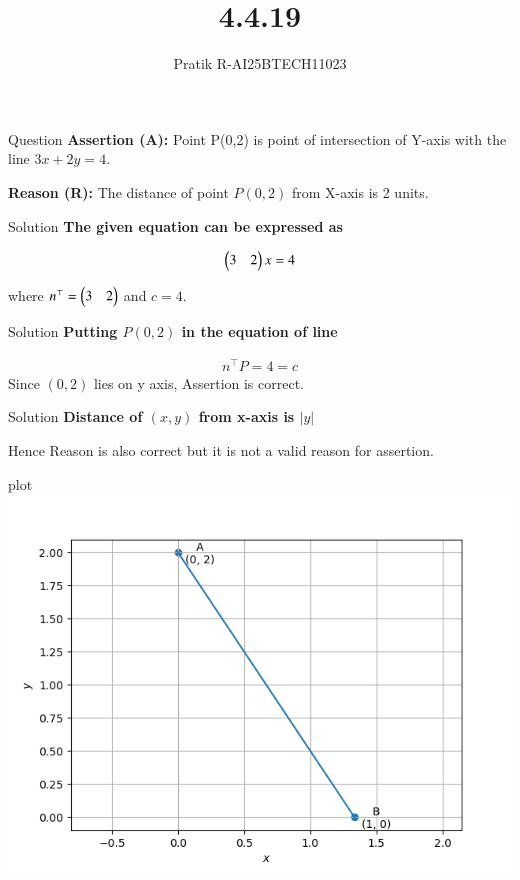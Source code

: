 \documentclass{beamer}
\title 
{4.4.19}
\author 
{Pratik R-AI25BTECH11023}
\begin{document}
\frame{\titlepage}
\begin{frame}{Question}
\textbf{Assertion (A):} Point P(0,2) is point of intersection of Y-axis with the line
$3x + 2y = 4$.

\textbf{Reason (R):} The distance of point $P(0,2)$ from X-axis is 2 units.
\end{frame}
\begin{frame}{Solution} 
\textbf{The given equation can be expressed as}

\begin{align}
    \begin{pmatrix}3 & 2\end{pmatrix}x =4
\end{align}

where $n^\top = \begin{pmatrix}3&2\end{pmatrix}$ and $c = 4$.
\end{frame}
\begin{frame}{Solution}
\textbf{Putting $P(0,2)$ in the equation of line}

\begin{align}
n^\top P =4=c
\end{align}
Since $(0,2)$ lies on y axis, Assertion is correct.
\end{frame}
\begin{frame}{Solution}
\textbf{Distance of $(x,y)$ from x-axis is $|y|$}

Hence Reason is also correct but it is not a valid reason for assertion.
\end{frame}
\begin{frame}{plot}
\centering
    \includegraphics[width=\columnwidth, height=0.8\textheight, keepaspectratio]{../figs/fig.png}     
\end{frame}
\end{document}
